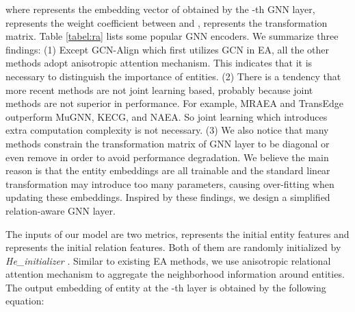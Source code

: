 \documentclass[sigconf]{acmart}
\begin{document}
where  represents the embedding vector of  obtained by the -th GNN layer,  represents the weight coefficient between  and ,  represents the transformation matrix.
Table \ref{tabel:ra} lists some popular GNN encoders.
We summarize three findings:
(1) Except GCN-Align which first utilizes GCN in EA, all the other methods adopt anisotropic attention mechanism.
This indicates that it is necessary to distinguish the importance of entities.
(2) There is a tendency that more recent methods are not joint learning based, probably because joint methods are not superior in performance.
For example, MRAEA and TransEdge outperform MuGNN, KECG, and NAEA.
So joint learning which introduces extra computation complexity is not necessary.
(3) We also notice that many methods constrain the transformation matrix  of GNN layer to be diagonal or even remove  in order to avoid performance degradation.
We believe the main reason is that the entity embeddings are all trainable and the standard linear transformation may introduce too many parameters, causing over-fitting when updating these embeddings.
Inspired by these findings, we design a simplified relation-aware GNN layer.

\begin{table}
\begin{center}
\end{center}
\caption{Categorization of GNN encoders in some popular EA approaches. }\label{tabel:ra}
\end{table}


The inputs of our model are two metrics,  represents the initial entity features
and  represents the initial relation features.
Both of them are randomly initialized by \emph{He\_initializer} \cite{DBLP:conf/iccv/HeZRS15}.
Similar to existing EA methods, we use anisotropic relational attention mechanism to aggregate the neighborhood information around entities.
The output embedding of entity  at the -th layer is obtained by the following equation:
\end{document}
